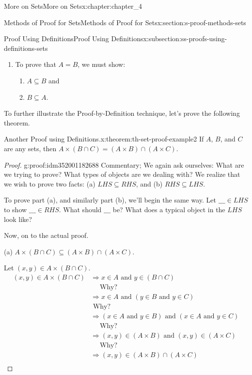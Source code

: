 \documentclass[oneside,10pt,]{book}
\begin{document}
\begin{chapterptx}{More on Sets}{}{More on Sets}{}{}{x:chapter:chapter_4}
\begin{sectionptx}{Methods of Proof for Sets}{}{Methods of Proof for Sets}{}{}{x:section:s-proof-methods-sets}
\begin{subsectionptx}{Proof Using Definitions}{}{Proof Using Definitions}{}{}{x:subsection:ss-proofs-using-definitions-sets}
\begin{enumerate}[label=(\arabic*)]
\item{}To prove that \(A = B\), we must show:%
\par
%
\begin{enumerate}[label=(\alph*)]
\item{}\(A\subseteq B\) and%
\item{}\(B \subseteq A\).%
\end{enumerate}
%
\end{enumerate}
%
\par
To further illustrate the Proof-by-Definition technique, let's prove the following theorem.%
\begin{theorem}{Another Proof using Definitions.}{}{x:theorem:th-set-proof-example2}%
If  \(A\), \(B\), and \(C\) are any sets, then \(A \times  (B \cap  C) = (A \times  B) \cap  (A \times  C)\).%
\end{theorem}
\begin{proof}{}{g:proof:idm352001182688}
Commentary; We again ask ourselves: What are we trying to prove? What types of objects are we dealing with? We realize that we wish to prove two facts: (a) \(LHS\subseteq RHS\), and (b) \(RHS\subseteq LHS\).%
\par
To prove part (a), and similarly part (b), we'll begin the same way. Let  \(\_\_\_ \in  LHS\) to show \(\_\_\_ \in  RHS\). What should \(\_\_\_\) be?  What does a typical object in the \(LHS\) look like?%
\par
Now, on to the actual proof.%
\par
(a) \(A\times (B\cap  C)\subseteq (A\times B)\cap (A\times C)\).%
\par
Let \((x, y) \in  A\times (B\cap C)\).%
\begin{equation*}
\begin{split}
(x, y) \in A\times (B\cap C) &\Rightarrow x \in  A \textrm{ and } y \in  (B\cap  C)\\
&\quad \textrm{ Why? }\\
&\Rightarrow x \in  A \textrm{ and }(y \in  B\textrm{ and } y \in  C)\\
&\textrm{ Why? }\\
&\Rightarrow (x \in  A \textrm{ and } y \in  B) \textrm{ and } (x \in  A \textrm{ and } y \in C)\\
&\quad \textrm{ Why? }\\
&\Rightarrow  (x, y) \in  (A\times B) \textrm{ and } (x, y) \in  (A \times C)\\
&\quad \textrm{ Why? }\\
&\Rightarrow (x, y) \in  (A\times  B) \cap (A\times C)\\

\end{split}
\end{equation*}
\end{proof}
\end{subsectionptx}
\end{sectionptx}
\end{chapterptx}
\end{document}
